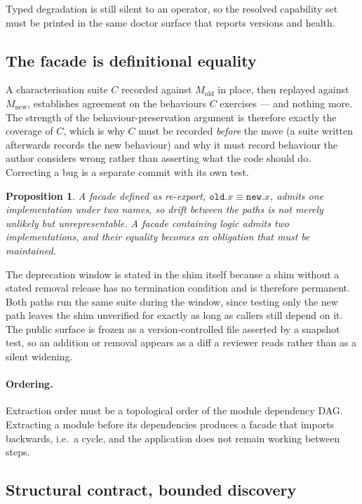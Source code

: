 \documentclass[11pt]{article}
\newtheorem{prop}{Proposition}[section]
\begin{document}
Typed degradation is still silent to an operator, so the resolved capability set
must be printed in the same doctor surface that reports versions and health.

\subsection{The facade is definitional equality}
\label{lbl:HS-BOUND-02}

A characterisation suite $C$ recorded against $M_{\mathrm{old}}$ in place, then
replayed against $M_{\mathrm{new}}$, establishes agreement on the behaviours
$C$ exercises --- and nothing more. The strength of the behaviour-preservation
argument is therefore exactly the coverage of $C$, which is why $C$ must be
recorded \emph{before} the move (a suite written afterwards records the new
behaviour) and why it must record behaviour the author considers wrong rather
than asserting what the code should do. Correcting a bug is a separate commit
with its own test.

\begin{prop}
A facade defined as re-export, $\mathtt{old}.x \equiv \mathtt{new}.x$, admits
one implementation under two names, so drift between the paths is not merely
unlikely but unrepresentable. A facade containing logic admits two
implementations, and their equality becomes an obligation that must be
maintained.
\end{prop}

The deprecation window is stated in the shim itself because a shim without a
stated removal release has no termination condition and is therefore permanent.
Both paths run the same suite during the window, since testing only the new
path leaves the shim unverified for exactly as long as callers still depend on
it. The public surface is frozen as a version-controlled file asserted by a
snapshot test, so an addition or removal appears as a diff a reviewer reads
rather than as a silent widening.

\paragraph{Ordering.} Extraction order must be a topological order of the
module dependency DAG. Extracting a module before its dependencies produces a
facade that imports backwards, i.e.\ a cycle, and the application does not
remain working between steps.

\subsection{Structural contract, bounded discovery}
\label{lbl:HS-BOUND-03}
\end{document}
